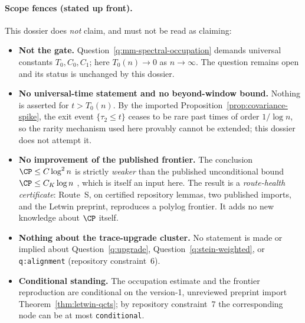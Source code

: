 \documentclass[../main.tex]{subfiles}
\begin{document}
\paragraph{Scope fences (stated up front).}
This dossier does \emph{not} claim, and must not be read as claiming:
\begin{itemize}[leftmargin=1.6em]
  \item \textbf{Not the gate.}  Question~\ref{q:mm-spectral-occupation} demands
  universal constants $T_0,C_0,C_1$; here $T_0(n)\to0$ as $n\to\infty$.  The question
  remains open and its status is unchanged by this dossier.
  \item \textbf{No universal-time statement and no beyond-window bound.}  Nothing is
  asserted for $t>T_0(n)$.  By the imported Proposition~\ref{prop:covariance-spike},
  the exit event $\{\tau_2\le t\}$ ceases to be rare past times of order $1/\log n$, so
  the rarity mechanism used here provably cannot be extended; this dossier does not
  attempt it.
  \item \textbf{No improvement of the published frontier.}  The conclusion
  $\CP\le C\log^2n$ is strictly \emph{weaker} than the published unconditional bound
  $\CP\le C_K\log n$ \cite{Klartag2023Logarithmic}, which is itself an input here.  The
  result is a \emph{route-health certificate}: Route~S, on certified repository lemmas,
  two published imports, and the Letwin preprint, reproduces a polylog frontier.  It
  adds no new knowledge about $\CP$ itself.
  \item \textbf{Nothing about the trace-upgrade cluster.}  No statement is made or
  implied about Question~\ref{q:upgrade}, Question~\ref{q:stein-weighted}, or
  \texttt{q:alignment} (repository constraint~6).
  \item \textbf{Conditional standing.}  The occupation estimate and the frontier
  reproduction are conditional on the version-1, unreviewed preprint import
  Theorem~\ref{thm:letwin-qcts}; by repository constraint~7 the corresponding node can
  be at most \texttt{conditional}.
\end{itemize}
\end{document}
